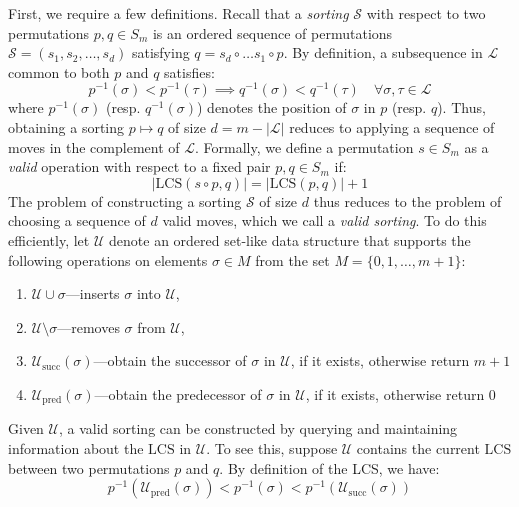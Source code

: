 \documentclass[sn-mathphys]{sn-jnl}
\begin{document}
First, we require a few definitions. Recall that a \emph{sorting} $\mathcal{S}$ with respect to two permutations $p, q \in S_m$ is an ordered sequence of permutations $\mathcal{S} = (s_1, s_2, \dots, s_d)$ satisfying $q = s_d \circ \dots s_1 \circ p$.
By definition, a subsequence in $\mathcal{L}$ common to both $p$ and $q$ satisfies:
\begin{equation}
	p^{-1}(\sigma) < p^{-1}(\tau) \implies q^{-1}(\sigma) < q^{-1}(\tau) \quad \forall \sigma, \tau \in \mathcal{L}
\end{equation}
 where $p^{-1}(\sigma)$ (resp. $q^{-1}(\sigma)$) denotes the position of $\sigma$ in $p$ (resp. $q$). Thus, obtaining a sorting $p \mapsto q$ of size $d = m - \lvert \mathcal{L} \rvert$ reduces to applying a sequence of moves in the complement of $\mathcal{L}$. 
 Formally, we define a permutation $s \in S_m$ as a \emph{valid} operation with respect to a fixed pair $p, q \in S_m$ if:
 \begin{equation}\label{eq:valid_move}
 	\lvert \mathrm{LCS}(s \circ p, q) \rvert = \lvert \mathrm{LCS}(p,q) \rvert + 1
 \end{equation}
  The problem of constructing a sorting $\mathcal{S}$ of size $d$ thus reduces to the problem of choosing a sequence of $d$ valid moves, which we call a \emph{valid sorting}. 
  To do this efficiently, let $\mathcal{U}$ denote an ordered set-like data structure that supports the following operations on elements $\sigma \in M$ from the set $M = \{0, 1, \dots, m+1\}$:
  \begin{enumerate}
  	\item $\mathcal{U} \cup \sigma$---inserts $\sigma$ into $\mathcal{U}$,
  	\item $\mathcal{U} \setminus \sigma$---removes $\sigma$ from $\mathcal{U}$,
  	\item $\mathcal{U}_{\mathrm{succ}}(\sigma)$---obtain the successor of $\sigma$ in $\mathcal{U}$, if it exists, otherwise return $m+1$
  	\item $\mathcal{U}_{\mathrm{pred}}(\sigma)$---obtain the predecessor of $\sigma$ in $\mathcal{U}$, if it exists, otherwise return $0$
  \end{enumerate}
  Given $\mathcal{U}$, a valid sorting can be constructed by querying and maintaining information about the $\mathrm{LCS}$ in $\mathcal{U}$. To see this, suppose $\mathcal{U}$ contains the current $\mathrm{LCS}$ between two permutations $p$ and $q$. By definition of the LCS, we have:
 \begin{equation}\label{eq:valid_move_ineq}
 	p^{-1}(\mathcal{U}_{\mathrm{pred}}(\sigma)) < p^{-1}(\sigma) < p^{-1}(\mathcal{U}_{\mathrm{succ}}(\sigma))
 \end{equation}
\end{document}
